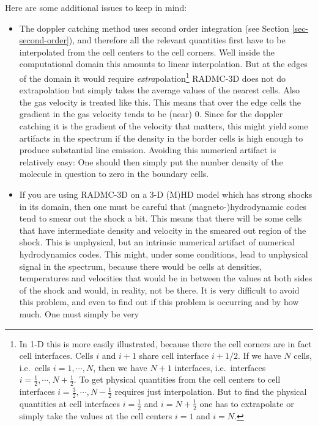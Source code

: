\documentclass{report}
\begin{document}
Here are some additional issues to keep in mind:
\begin{itemize}
\item The doppler catching method uses second order integration (see Section
  \ref{sec-second-order}), and therefore all the relevant quantities first
  have to be interpolated from the cell centers to the cell corners. Well
  inside the computational domain this amounts to linear interpolation. But
  at the edges of the domain it would require {\em
    extra}polation\footnote{In 1-D this is more easily illustrated, because
    there the cell corners are in fact cell interfaces. Cells $i$ and $i+1$
    share cell interface $i+1/2$. If we have $N$ cells, i.e.\ cells
    $i=1,\cdots,N$, then we have $N+1$ interfaces, i.e.\ interfaces
    $i=\tfrac{1}{2},\cdots,N+\tfrac{1}{2}$. To get physical quantities from
    the cell centers to cell interfaces
    $i=\tfrac{3}{2},\cdots,N-\tfrac{1}{2}$ requires just interpolation. But
    to find the physical quantities at cell interfaces $i=\tfrac{1}{2}$ and
    $i=N+\tfrac{1}{2}$ one has to extrapolate or simply take the values at
    the cell centers $i=1$ and $i=N$.} RADMC-3D does not do
  extrapolation but simply takes the average values of the nearest
  cells. Also the gas velocity is treated like this. This means that over
  the edge cells the gradient in the gas velocity tends to be (near)
  0. Since for the doppler catching it is the gradient of the velocity that
  matters, this might yield some artifacts in the spectrum if the density in
  the border cells is high enough to produce substantial line
  emission. Avoiding this numerical artifact is relatively easy: One should
  then simply put the number density of the molecule in question to zero in
  the boundary cells.
\item If you are using RADMC-3D on a 3-D (M)HD model which has strong shocks
  in its domain, then one must be careful that (magneto-)hydrodynamic codes
  tend to smear out the shock a bit. This means that there will be some
  cells that have intermediate density and velocity in the smeared out
  region of the shock. This is unphysical, but an intrinsic numerical
  artifact of numerical hydrodynamics codes. This might, under some
  conditions, lead to unphysical signal in the spectrum, because there would
  be cells at densities, temperatures and velocities that would be in
  between the values at both sides of the shock and would, in reality, not
  be there. It is very difficult to avoid this problem, and even to find out
  if this problem is occurring and by how much. One must simply be very

\end{itemize}
\end{document}
